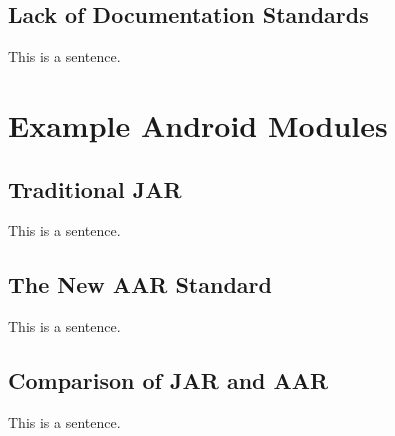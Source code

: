\subsection{Lack of Documentation Standards}
This is a sentence.

\section{Example Android Modules}

\subsection{Traditional JAR}
This is a sentence.

\subsection{The New AAR Standard}
This is a sentence.

\subsection{Comparison of JAR and AAR}
This is a sentence.
